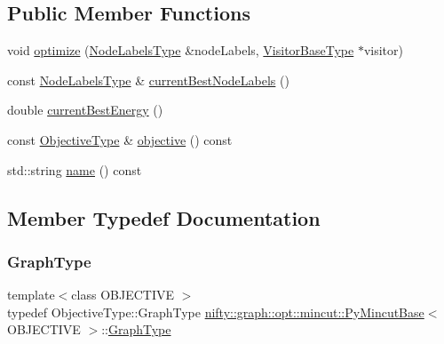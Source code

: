 \subsection*{Public Member Functions}
\begin{DoxyCompactItemize}
\item 
void \hyperlink{classnifty_1_1graph_1_1opt_1_1mincut_1_1PyMincutBase_a20e6b88e3ff713ad4bf7787d2b26dcaa}{optimize} (\hyperlink{classnifty_1_1graph_1_1opt_1_1mincut_1_1PyMincutBase_a54c8146f750e7085a430228c3082a0cf}{Node\+Labels\+Type} \&node\+Labels, \hyperlink{classnifty_1_1graph_1_1opt_1_1mincut_1_1PyMincutBase_ab39a6b86f6807f6d1cc2325567bfff6f}{Visitor\+Base\+Type} $\ast$visitor)
\item 
const \hyperlink{classnifty_1_1graph_1_1opt_1_1mincut_1_1PyMincutBase_a54c8146f750e7085a430228c3082a0cf}{Node\+Labels\+Type} \& \hyperlink{classnifty_1_1graph_1_1opt_1_1mincut_1_1PyMincutBase_afeed3e6753137062c86be81b20d442fa}{current\+Best\+Node\+Labels} ()
\item 
double \hyperlink{classnifty_1_1graph_1_1opt_1_1mincut_1_1PyMincutBase_a81f6fb9ecd228513e61e180cc7faf28e}{current\+Best\+Energy} ()
\item 
const \hyperlink{classnifty_1_1graph_1_1opt_1_1mincut_1_1PyMincutBase_ad5ee76481f2aeb8544717a69b2760a6b}{Objective\+Type} \& \hyperlink{classnifty_1_1graph_1_1opt_1_1mincut_1_1PyMincutBase_a9eb51467ec7c3ca43c2df86237030deb}{objective} () const
\item 
std\+::string \hyperlink{classnifty_1_1graph_1_1opt_1_1mincut_1_1PyMincutBase_a0c9a8b12b5a09262a007ae964fb04b04}{name} () const
\end{DoxyCompactItemize}


\subsection{Member Typedef Documentation}
\mbox{\label{classnifty_1_1graph_1_1opt_1_1mincut_1_1PyMincutBase_a8af93d1298541076bf3ca413fd200979}} 
\subsubsection{\texorpdfstring{Graph\+Type}{GraphType}}
{\footnotesize\ttfamily template$<$class O\+B\+J\+E\+C\+T\+I\+VE $>$ \\
typedef Objective\+Type\+::\+Graph\+Type \hyperlink{classnifty_1_1graph_1_1opt_1_1mincut_1_1PyMincutBase}{nifty\+::graph\+::opt\+::mincut\+::\+Py\+Mincut\+Base}$<$ O\+B\+J\+E\+C\+T\+I\+VE $>$\+::\hyperlink{classnifty_1_1graph_1_1opt_1_1mincut_1_1PyMincutBase_a8af93d1298541076bf3ca413fd200979}{Graph\+Type}}

